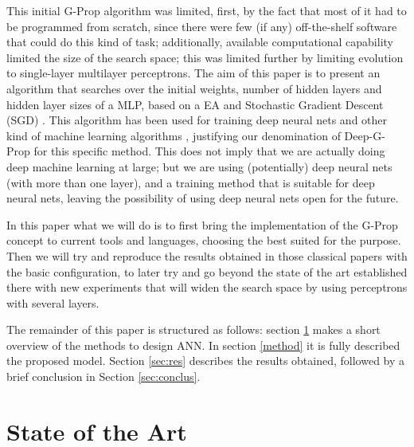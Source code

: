 \documentclass[runningheads]{llncs}
\begin{document}
This initial G-Prop algorithm was limited, first, by the fact that
most of it had to be programmed from scratch, since there were few (if
any) off-the-shelf software that could do this kind of task; 
additionally, available computational capability limited the size of
the search space; this was limited further by limiting evolution to
single-layer multilayer perceptrons. The aim of this paper is to
present an algorithm that searches over the initial weights, number of
hidden layers and hidden layer sizes of a MLP, based on a EA and
Stochastic Gradient Descent (SGD) \cite{bottou2012stochastic}. This
algorithm has been used for training deep neural nets and other kind
of machine learning algorithms
\cite{bottou2012stochastic,bottou2010large}, justifying our
denomination of Deep-G-Prop for this specific method. This does not
imply that we are actually doing deep machine learning at large; but
we are using (potentially) deep neural nets (with more than one
layer), and a training method that is suitable for deep neural nets,
leaving the possibility of using deep neural nets open for the future.

In this paper what we will do is to first bring the implementation of
the G-Prop concept to current tools and languages, choosing the best
suited for the purpose. Then we will try and reproduce the results
obtained in those classical papers with the basic configuration, to
later try and go beyond the state of the art established there with
new experiments that will widen the search space by using perceptrons
with several layers.

The remainder of this paper is structured as follows:
section \ref{soa} makes a short overview of the methods to design ANN.
In section \ref{method} it is fully described the proposed model.
Section \ref{sec:res} describes the results obtained,
followed by a brief conclusion in Section \ref{sec:conclus}.

\section{State of the Art}
\label{soa}
\end{document}
